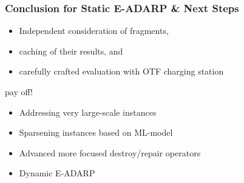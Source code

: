 \documentclass[aspectratio=1610]{beamer}
\begin{document}
\begin{frame}
\begin{table}[]
{\begin{tabular}{lrrrrrrrrrrrr}
\hline
\end{tabular}%
}
\end{table}
\end{frame}


\begin{frame}
	\frametitle{Conclusion for Static E-ADARP \& Next Steps}

\begin{itemize}
	\item Independent consideration of fragments,
	\item caching of their results, and 
	\item carefully crafted evaluation with OTF charging station
\end{itemize}
pay off!

\bigskip 

\begin{itemize}
	\item Addressing very large-scale instances
	\item Sparsening instances based on ML-model
	\item Advanced more focused destroy/repair operators 
	\item Dynamic E-ADARP 
\end{itemize}
	
\end{frame}
\end{document}
